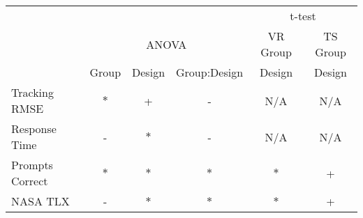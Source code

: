 \begin{tabular}{@{}lccc|cc@{}}
\toprule
                & & & & \multicolumn{2}{c}{t-test} \\
                & \multicolumn{3}{c|}{ANOVA} & VR Group & TS Group \\
                & Group & Design & Group:Design & Design   & Design   \\
\midrule
Tracking RMSE   & $*$ & +   &  -  & \small N/A & \small N/A \\
Response Time   &  -  & $*$  &  -  & \small N/A & \small N/A \\
Prompts Correct & $*$ & $*$ & $*$ & $*$ & + \\
NASA TLX        &  -  & $*$ & $*$  & $*$ & + \\
\bottomrule
\end{tabular}
